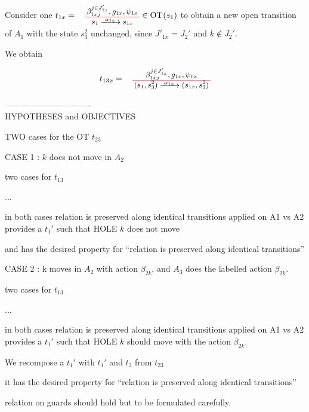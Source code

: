 \documentclass[runningheads]{llncs}
\begin{document}
\begin{enumerate}
Consider one $t_{1x}=\OT{s_1}{s_{1x}}{\alpha_{1x}}{\beta_{1xj}^{j \in J'_{1x}}}{g_{1x}}{\psi_{1x}}\in \fOT{s_1}$ to obtain a new open transition of $A_1$    with the state $s^2_3$ unchanged, since $J'_{1x} = J_2'$ and $k \not\in J_2'$.


We obtain 

\[t_{13x}=\OT{(s_1,s^2_3)}{(s_{1x},s^2_3)}{\alpha_{1x}}{\beta_{1xj}^{j \in J'_{1x}}}{g_{1x}}{\psi_{1x}}\]

-------------------------------\\

HYPOTHESES and OBJECTIVES

TWO cases for the OT $t_{23}$

CASE 1 : $k$ does not move in $A_2$

two cases for  $t_{13}$

 ...

in both cases relation is preserved along identical transitions applied on A1 vs A2 provides a $t_{1}'$ such that HOLE $k$ does not move

and has the desired property for ``relation is preserved along identical transitions''

CASE 2 : k moves in $A_2$ with action $\beta_{2 k}$, and $A_3$ does the labelled action $\beta_{2 k}$.

two cases for  $t_{13}$

 ...

in both cases relation is preserved along identical transitions applied on A1 vs A2 provides a $t_{1}'$ such that HOLE $k$ should move with the action $\beta_{2 k}$.

We recompose a $t_{1}'$ with $t_{1}'$ and $t_3$ from  $t_{23}$

it has the desired property for ``relation is preserved along identical transitions''

relation on guards should hold but to be formulated carefully.

\end{enumerate}
\end{document}
